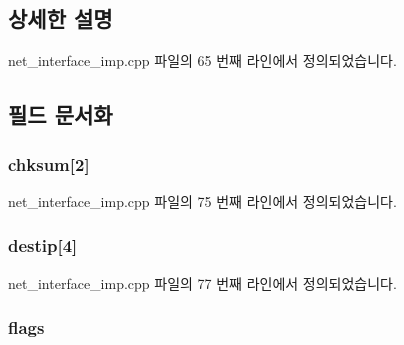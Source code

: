 \subsection{상세한 설명}


net\+\_\+interface\+\_\+imp.\+cpp 파일의 65 번째 라인에서 정의되었습니다.



\subsection{필드 문서화}
\subsubsection[{\texorpdfstring{chksum}{chksum}}]{ chksum\mbox{[}2\mbox{]}}\hypertarget{structavdecc__lib_1_1ipheader_a607d4d558dca8536ef0828423bdf9e4c}{}\label{structavdecc__lib_1_1ipheader_a607d4d558dca8536ef0828423bdf9e4c}


net\+\_\+interface\+\_\+imp.\+cpp 파일의 75 번째 라인에서 정의되었습니다.

\subsubsection[{\texorpdfstring{destip}{destip}}]{ destip\mbox{[}4\mbox{]}}\hypertarget{structavdecc__lib_1_1ipheader_ade2ae405830238a053ad15dd5ad02aee}{}\label{structavdecc__lib_1_1ipheader_ade2ae405830238a053ad15dd5ad02aee}


net\+\_\+interface\+\_\+imp.\+cpp 파일의 77 번째 라인에서 정의되었습니다.

\subsubsection[{\texorpdfstring{flags}{flags}}]{ {\bf flags}}\hypertarget{structavdecc__lib_1_1ipheader_aa2585d779da0ab21273a8d92de9a0ebe}{}\label{structavdecc__lib_1_1ipheader_aa2585d779da0ab21273a8d92de9a0ebe}


